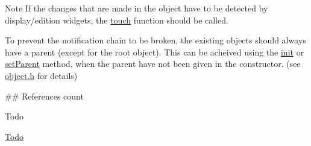 \begin{DoxyNote}{\-Note}
\-If the changes that are made in the object have to be detected by display/edition widgets, the \hyperlink{class_game_object_a2130d5674df041b5a7eaf987f9b1e642}{touch} function should be called. 

\-To prevent the notification chain to be broken, the existing objects should always have a parent (except for the root object). \-This can be acheived using the \hyperlink{class_game_object_abb6a1fa1a89307820874179b20010f6d}{init} or \hyperlink{class_game_object_ae34944b23d5d7d472d5c8da3f42fb2e3}{set\-Parent} method, when the parent have not been given in the constructor. (see \hyperlink{object_8h}{object.\-h} for details)
\end{DoxyNote}
\#\# \-References count

\begin{DoxyRefDesc}{\-Todo}
\item[\hyperlink{todo__todo000001}{\-Todo}]\end{DoxyRefDesc}


